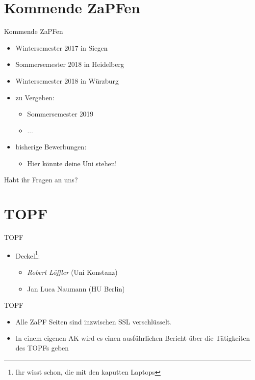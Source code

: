 \documentclass[compress, aspectratio=169]{beamer}
\begin{document}
\section{Kommende ZaPFen}
\begin{frame}{Kommende ZaPFen}
  \begin{itemize}
    \item Wintersemester 2017 in Siegen
    \item Sommersemester 2018 in Heidelberg
    \item Wintersemester 2018 in Würzburg
    \item zu Vergeben:
      \begin{itemize}
      \item Sommersemester 2019
      \item ...
      \end{itemize}
    \item bisherige Bewerbungen:
      \begin{itemize}
      \item Hier könnte deine Uni stehen!
      \end{itemize}
    \end{itemize}
\end{frame}

\begin{frame}[plain]
  \begin{center}
    \Huge Habt ihr Fragen an uns?
    \end{center}
\end{frame}

\section{TOPF}
\begin{frame}{TOPF}
  \begin{itemize}
    \item[] Deckel\footnote{Ihr wisst schon, die mit den kaputten Laptops}:
      \begin{itemize}
      \item \emph{Robert Löffler} (Uni Konstanz)
      \item Jan Luca Naumann (HU Berlin)
      \end{itemize}
    \end{itemize}
\end{frame}

\begin{frame}{TOPF}
  \begin{itemize}
  \item Alle ZaPF Seiten sind inzwischen SSL verschlüsselt. %
  \item In einem eigenen AK wird es einen ausführlichen Bericht über die Tätigkeiten des TOPFs geben
  \end{itemize}
\end{frame}
\end{document}
